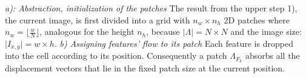 \documentclass[conference]{IEEEtran}
\begin{document}
\textit{a): Abstraction, initialization of the patches} \newline
The result from the upper step 1), the current image, is first divided into a grid with $n_w \times n_h$ 2D patches where $n_w = \lfloor \frac{w}{N} \rfloor$, analogous for the height $n_h$, because $\vert \Lambda \vert = N \times N$ and the image size: $\vert I_{x,y} \vert = w \times h$. \newline
%
\textit{b) Assigning features' flow to its patch} \newline
Each feature is dropped into the cell according to its position. Consequently a patch $\Lambda_{F_k}$ absorbs all the displacement vectors that lie in the fixed patch size at the current position.\\
\end{document}
